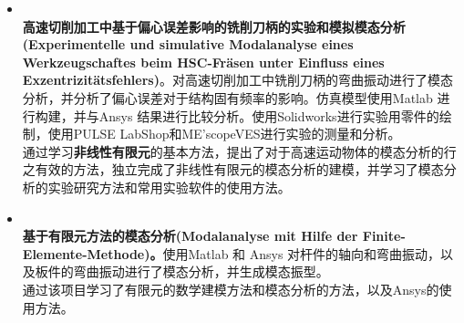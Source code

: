 \documentclass[zh]{resume}
\begin{document}
\begin{itemize}
	
	\item 
	\\
	\textbf{高速切削加工中基于偏心误差影响的铣削刀柄的实验和模拟模态分析(Experimentelle und simulative Modalanalyse eines Werkzeugs\-chaftes beim HSC-Fräsen unter Einfluss eines Exzentrizitätsfehlers)}。对高速切削加工中铣削刀柄的弯曲振动进行了模态分析，并分析了偏心误差对于结构固有频率的影响。仿真模型使用Matlab 进行构建，并与Ansys 结果进行比较分析。使用Solidworks进行实验用零件的绘制，使用PULSE LabShop和ME'scopeVES进行实验的测量和分析。\\
	通过学习\textbf{非线性有限元}的基本方法，提出了对于高速运动物体的模态分析的行之有效的方法，独立完成了非线性有限元的模态分析的建模，并学习了模态分析的实验研究方法和常用实验软件的使用方法。
	
	\item 
	\\
	\textbf{基于有限元方法的模态分析(Modalanalyse mit Hilfe der Finite-Elemente-Methode)。}使用Matlab 和 Ansys 对杆件的轴向和弯曲振动，以及板件的弯曲振动进行了模态分析，并生成模态振型。\\
	通过该项目学习了有限元的数学建模方法和模态分析的方法，以及Ansys的使用方法。
	

\end{itemize}
\end{document}
